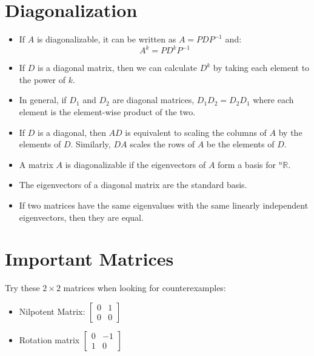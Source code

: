 \documentclass{article}
\begin{document}
    \section{Diagonalization}
    \begin{itemize}
        \item If $A$ is diagonalizable, it can be written as $A=PDP^{-1}$ and:
        \begin{equation}
            A^k = PD^kP^{-1}
        \end{equation}
        \item If $D$ is a diagonal matrix, then we can calculate $D^k$ by taking each element to the power of $k$. 
        \item In general, if $D_1$ and $D_2$ are diagonal matrices, $D_1D_2 = D_2D_1$ where each element is the element-wise product of the two.
        \item If $D$ is a diagonal, then $AD$ is equivalent to scaling the columns of $A$ by the elements of $D$. Similarly, $DA$ scales the rows of $A$ be the elements of $D$.
        \item A matrix $A$ is diagonalizable if the eigenvectors of $A$ form a basis for ${^n}\mathbb{R}$.
        \item The eigenvectors of a diagonal matrix are the standard basis.
        \item If two matrices have the same eigenvalues with the same linearly independent eigenvectors, then they are equal.

    \end{itemize}
    \section{Important Matrices}
    Try these $2\times 2$ matrices when looking for counterexamples:
    \begin{itemize}
        \item Nilpotent Matrix: $\begin{bmatrix}
            0&1\\0&0
        \end{bmatrix}$
        \item Rotation matrix $\begin{bmatrix}
            0 & -1 \\ 
            1 & 0
        \end{bmatrix}$
    \end{itemize}
\end{document}
